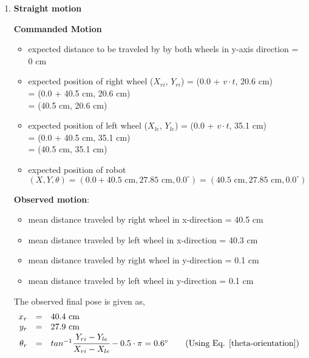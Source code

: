 \begin{enumerate}
\item \textbf{Straight motion}

	\textbf{Commanded Motion}

	\begin{itemize}

		\item expected distance to be traveled by by both wheels in y-axis direction = $0$ cm
	
		\item expected position of right wheel ($X_{ri}$, $Y_{ri}$) = (0.0 + $v\cdot t$, 20.6 cm) \\
			   = (0.0 + 40.5 cm, 20.6 cm)\\
			 = (40.5 cm, 20.6 cm)
	
		\item expected position of left wheel ($X_{le}$, $Y_{le}$) = (0.0 + $v\cdot t$, 35.1 cm) \\
		= (0.0 + 40.5 cm, 35.1 cm)\\
		= (40.5 cm, 35.1 cm)
	
		\item expected position of robot $(X, Y, \theta) = (0.0 + 40.5 \text{ cm}, 27.85 \text{ cm}, 0.0^{\circ}) = (40.5 \text{ cm}, 27.85 \text{ cm}, 0.0^{\circ})$
\end{itemize}
	
\textbf{Observed motion}:
\begin{itemize}
\item mean distance traveled by right wheel in x-direction = 40.5 cm
\item mean distance traveled by left wheel in x-direction = 40.3 cm 
\item mean distance traveled by right wheel in y-direction = 0.1 cm 
\item mean distance traveled by left wheel in y-direction = 0.1 cm 
\end{itemize}

The observed final pose is given as,
\begin{equation}
\begin{array}{rcl}
x_r &=& 40.4 \text{ cm} \\
y_r &=& 27.9 \text{ cm} \\
\theta_r &=& tan^{-1}\cfrac{Y_{ri} - Y_{le}}{X_{ri} - X_{le}} - 0.5\cdot{\pi} = 0.6^{\circ} \qquad \text{(Using Eq. \ref{theta-orientation})}
\end{array}
\end{equation}
	

\end{enumerate}
